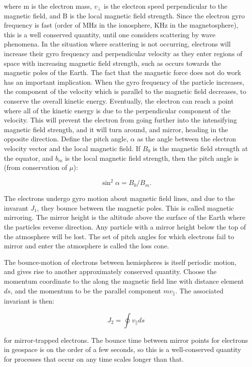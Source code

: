 where m is the electron mass, $v_{\perp}$ is the electron speed perpendicular to the magnetic field, and B is the local magnetic field strength. Since the electron gyro frequency is fast (order of MHz in the ionosphere, KHz in the magnetosphere), this is a well conserved quantity, until one considers scattering by wave phenomena. In the situation where scattering is not occurring, electrons will increase their gyro frequency and perpendicular velocity as they enter regions of space with increasing magnetic field strength, such as occurs towards the magnetic poles of the Earth. The fact that the magnetic force does not do work has an important implication. When the gyro frequency of the particle increases, the component of the velocity which is parallel to the magnetic field decreases, to conserve the overall kinetic energy. Eventually, the electron can reach a point where all of the kinetic energy is due to the perpendicular component of the velocity. This will prevent the electron from going further into the intensifying magnetic field strength, and it will turn around, and mirror, heading in the opposite direction. Define the pitch angle, $\alpha$ as the angle between the electron velocity vector and the local magnetic field. If $B_0$ is the magnetic field strength at the equator, and $b_m$ is the local magnetic field strength, then the pitch angle is (from conservation of $\mu$):

$$\sin^2\alpha = B_0/B_m.$$

The electrons undergo gyro motion about magnetic field lines, and due to the invarant $J_1$, they bounce between the magnetic poles. This is called magnetic mirroring. The mirror height is the altitude above the surface of the Earth where the particles reverse direction. Any particle with a mirror height below the top of the atmosphere will be lost. The set of pitch angles for which electrons fail to mirror and enter the atmosphere is called the loss cone. 

The bounce-motion of electrons between hemispheres is itself periodic motion, and gives rise to another approximately conserved quantity. Choose the momentum coordinate to the along the magnetic field line with distance element $ds$, and the momentum to be the parallel component $mv_{\parallel}$. The associated invariant is then:

$$J_2 = \oint v_{\parallel}ds$$

for mirror-trapped electrons. The bounce time between mirror points for electrons in geospace is on the order of a few seconds, so this is a well-conserved quantity for processes that occur on any time scales longer than that. 

